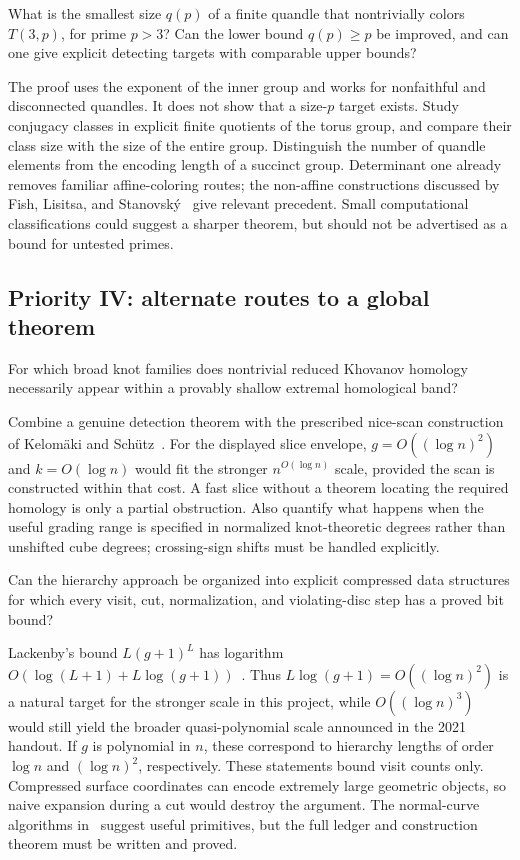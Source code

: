 \begin{question}
What is the smallest size $q(p)$ of a finite quandle that nontrivially
colors $T(3,p)$, for prime $p>3$? Can the lower bound $q(p)\geq p$
be improved, and can one give explicit detecting targets with comparable
upper bounds?
\end{question}
The proof uses the exponent of the inner group and works for nonfaithful
and disconnected quandles. It does not show that a size-$p$ target exists.
Study conjugacy classes in explicit finite quotients of the torus group,
and compare their class size with the size of the entire group. Distinguish
the number of quandle elements from the encoding length of a succinct
group. Determinant one already removes familiar affine-coloring routes;
the non-affine constructions discussed by Fish, Lisitsa, and
Stanovsk\'y~\cite{fish} give relevant precedent. Small computational
classifications could suggest a sharper theorem, but should not be
advertised as a bound for untested primes.

\subsection{Priority IV: alternate routes to a global theorem}

\begin{question}
For which broad knot families does nontrivial reduced Khovanov homology
necessarily appear within a provably shallow extremal homological band?
\end{question}
Combine a genuine detection theorem with the prescribed nice-scan
construction of Kelom\"aki and Sch\"utz~\cite{kelomaki}. For the
displayed slice envelope, $g=O((\log n)^2)$ and $k=O(\log n)$ would
fit the stronger $n^{O(\log n)}$ scale, provided the scan is constructed
within that cost. A fast slice without a theorem locating the required
homology is only a partial obstruction. Also quantify what happens when
the useful grading range is specified in normalized knot-theoretic
degrees rather than unshifted cube degrees; crossing-sign shifts must
be handled explicitly.

\begin{question}
Can the hierarchy approach be organized into explicit compressed data
structures for which every visit, cut, normalization, and violating-disc
step has a proved bit bound?
\end{question}
Lackenby's bound $L(g+1)^L$ has logarithm
$O(\log(L+1)+L\log(g+1))$~\cite{lackenby2026}. Thus
$L\log(g+1)=O((\log n)^2)$ is a natural target for the stronger
scale in this project, while $O((\log n)^3)$ would still yield the
broader quasi-polynomial scale announced in the 2021 handout.
If $g$ is polynomial in $n$, these correspond to hierarchy lengths of
order $\log n$ and $(\log n)^2$, respectively. These statements bound
visit counts only. Compressed surface coordinates can encode extremely
large geometric objects, so naive expansion during a cut would destroy
the argument. The normal-curve algorithms in~\cite{lackenbycurves}
suggest useful primitives, but the full ledger and construction theorem
must be written and proved.

